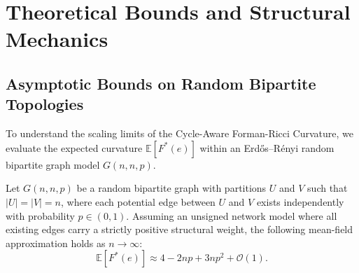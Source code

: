 \documentclass{siuro250211}
\theoremstyle{remark}
\theoremstyle{plain}
\begin{document}
\section{Theoretical Bounds and Structural Mechanics}

\subsection{Asymptotic Bounds on Random Bipartite Topologies}
To understand the scaling limits of the Cycle-Aware Forman-Ricci Curvature, we evaluate the expected curvature $\mathbb{E}[F^*(e)]$ within an Erdős–Rényi random bipartite graph model $G(n, n, p)$.

\begin{proposition}
Let $G(n, n, p)$ be a random bipartite graph with partitions $U$ and $V$ such that $|U| = |V| = n$, where each potential edge between $U$ and $V$ exists independently with probability $p \in (0,1)$. Assuming an unsigned network model where all existing edges carry a strictly positive structural weight, the following mean-field approximation holds as $n \to \infty$:
\begin{equation}
\mathbb{E}[F^*(e)] \approx 4 - 2np + 3np^2 + \mathcal{O}(1).
\end{equation}
\end{proposition}
\end{document}

